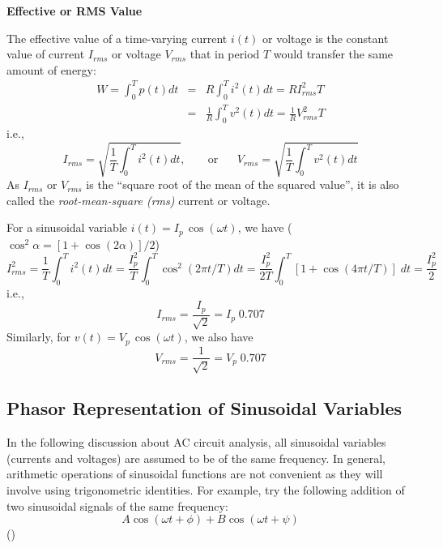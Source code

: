 \documentclass{article}
\begin{document}
{\bf Effective or RMS Value}

The effective value of a time-varying current $i(t)$ or voltage is the 
constant value of current $I_{rms}$ or voltage $V_{rms}$ that in period $T$ 
would transfer the same amount of energy:
\begin{eqnarray}
  W=\int_0^T p(t) dt&=&R\int_0^T i^2(t) dt
  =R I^2_{rms}T
  \nonumber \\
  &=&\frac{1}{R}\int_0^T v^2(t) dt=\frac{1}{R}V^2_{rms}T
\end{eqnarray}
i.e.,
\begin{equation} 
  I_{rms}=\sqrt{\frac{1}{T}\int_0^T i^2(t) dt},\;\;\;\;\;\;\;\mbox{or}\;\;\;\;\;\;
  V_{rms}=\sqrt{\frac{1}{T}\int_0^T v^2(t) dt}	
\end{equation}
As $I_{rms}$ or $V_{rms}$ is the ``square root of the mean of the squared value'',
it is also called the {\em root-mean-square (rms)} current or voltage.

For a sinusoidal variable $i(t)=I_p\,\cos(\omega t)$, we have
($\cos^2\alpha=[1+\cos(2\alpha)]/2$) 
\begin{equation} 
  I^2_{rms} = \frac{1}{T}\int_0^T i^2(t) dt
  = \frac{I^2_p}{T}\int_0^T \cos^2(2\pi t/T) dt
  = \frac{I^2_p}{2T}\int_0^T [1+\cos(4\pi t/T)]\; dt=\frac{I^2_p}{2} 
\end{equation}
i.e.,
\begin{equation}
  I_{rms}=\frac{I_p}{\sqrt{2}}=I_p\;0.707
\end{equation}
Similarly, for $v(t)=V_p\,\cos(\omega t)$, we also have 
\begin{equation}
  V_{rms}=\frac{1}{\sqrt{2}}=V_p\;0.707
\end{equation}

\subsection*{Phasor Representation of Sinusoidal Variables}

In the following discussion about AC circuit analysis, all sinusoidal
variables (currents and voltages) are assumed to be of the same 
frequency. In general, arithmetic operations of sinusoidal functions 
are not convenient as they will involve using trigonometric identities.
For example, try the following addition of two sinusoidal signals of the
same frequency:
\begin{equation}
  A\cos(\omega t+\phi)+B\cos(\omega t+\psi)
\end{equation}
()
\end{document}
